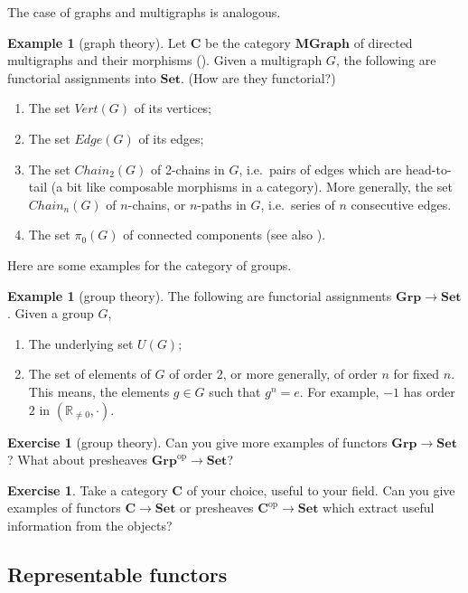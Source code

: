 \documentclass[a4paper,11pt,oneside]{scrbook}
\numberwithin{equation}{section}
\theoremstyle{plain}
\theoremstyle{definition}
\newtheorem{eg}[thm]{Example}
\newtheorem{ex}[thm]{Exercise}
\newcommand{\R}{\mathbb{R}}
\newcommand{\cat}[1]{{\mathbf{#1}}} %
\newcommand{\op}{\mathrm{op}} %
\newcommand{\Set}{\cat{Set}}
\newcommand{\Grp}{\cat{Grp}}
\DeclareMathOperator{\1}{\mathbbm{1}}
\DeclareMathOperator{\2}{\mathbbm{2}}
\begin{document}
The case of graphs and multigraphs is analogous.
\begin{eg}[graph theory]\label{graphtoset}
 Let $\cat{C}$ be the category $\cat{MGraph}$ of directed multigraphs and their morphisms (). Given a multigraph $G$, the following are functorial assignments into $\Set$. (How are they functorial?)
 \begin{enumerate}
  \item The set $\mathit{Vert}(G)$ of its vertices;
  \item The set $\mathit{Edge}(G)$ of its edges;
  \item The set $\mathit{Chain}_2(G)$ of 2-chains in $G$, i.e.~pairs of edges which are head-to-tail (a bit like composable morphisms in a category). More generally, the set $\mathit{Chain}_n(G)$ of $n$-chains, or $n$-paths in $G$, i.e.~series of $n$ consecutive edges.
  \item The set $\pi_0(G)$ of connected components (see also ).
 \end{enumerate}
\end{eg}

Here are some examples for the category of groups.
\begin{eg}[group theory]\label{grptoset}
 The following are functorial assignments $\Grp\to\Set$. Given a group $G$,
 \begin{enumerate}
  \item The underlying set $U(G)$;
  \item The set of elements of $G$ of order $2$, or more generally, of order $n$ for fixed $n$. This means, the elements $g\in G$ such that $g^n=e$. For example, $-1$ has order $2$ in $(\R_{\ne 0},\cdot)$.
 \end{enumerate}
\end{eg}

\begin{ex}[group theory]
 Can you give more examples of functors $\Grp\to\Set$? What about presheaves $\Grp^\op\to\Set$?
\end{ex}

\begin{ex}\label{yourcatset}
 Take a category $\cat{C}$ of your choice, useful to your field. Can you give examples of functors $\cat{C}\to\Set$ or presheaves $\cat{C}^\op\to\Set$ which extract useful information from the objects?
\end{ex}

\subsection{Representable functors}
\end{document}

